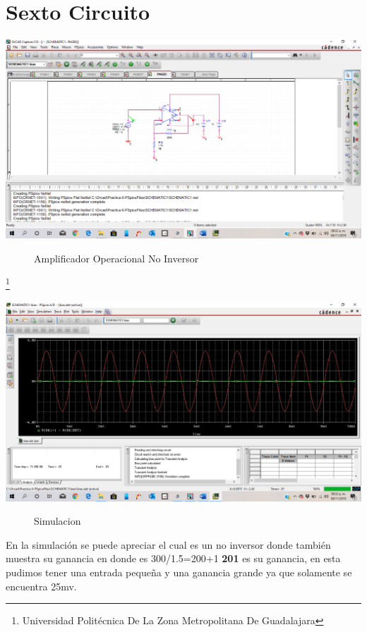 \documentclass[10pt,a4paper]{article}
\begin{document}
\section{Sexto Circuito}
\begin{center}
 \includegraphics[scale=0.3]{11.png}
 \begin{figure}[hbtp]
 \caption{Amplificador Operacional No Inversor}
 \centering
 \end{figure}
 \footnote{Universidad Politécnica De La Zona Metropolitana De Guadalajara} 

\newpage

  \includegraphics[scale=0.3]{12.png}
 \begin{figure}[hbtp]
 \caption{Simulacion}
 \centering
 \end{figure} 
\end{center}

En la simulación se puede apreciar el cual es un no inversor donde también muestra su ganancia en donde es 300/1.5=200+1 \textbf{201} es su ganancia, en esta pudimos tener una entrada pequeña y una ganancia grande ya que solamente se encuentra 25mv.
\end{document}
